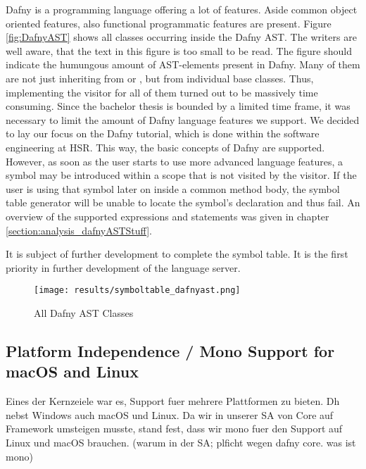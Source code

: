 Dafny is a programming language offering a lot of features.
Aside common object oriented features, also functional programmatic features are present.
Figure \ref{fig:DafnyAST} shows all classes occurring inside the Dafny AST.
The writers are well aware, that the text in this figure is too small to be read.
The figure should indicate the humungous amount of AST-elements present in Dafny.
Many of them are not just inheriting from  or , but from individual base classes.
Thus, implementing the visitor for all of them turned out to be massively time consuming.
Since the bachelor thesis is bounded by a limited time frame, it was necessary to limit the amount of Dafny language features we support.
We decided to lay our focus on the Dafny tutorial, which is done within the software engineering at HSR.
This way, the basic concepts of Dafny are supported.
However, as soon as the user starts to use more advanced language features, a symbol may be introduced within a scope that is not visited by the visitor.
If the user is using that symbol later on inside a common method body, the symbol table generator will be unable to locate the symbol's declaration and thus fail.
An overview of the supported expressions and statements was given in chapter \ref{section:analysis_dafnyASTStuff}.\\


It is subject of further development to complete the symbol table.
It is the first priority in further development of the language server.
\begin{figure}[h]
    \centering
    \texttt{[image: results/symboltable\_dafnyast.png]}
    \caption{All Dafny AST Classes}
    \label{fig:dafnyASTOverview}
\end{figure}

\subsection{Platform Independence / Mono Support for macOS and Linux}
Eines der Kernzeiele war es, Support fuer mehrere Plattformen zu bieten. Dh nebst Windows auch macOS und Linux.
Da wir in unserer SA von Core auf Framework umsteigen musste, stand fest, dass wir mono fuer den Support auf Linux und macOS brauchen.
(warum in der SA; plficht wegen dafny core. was ist mono)

